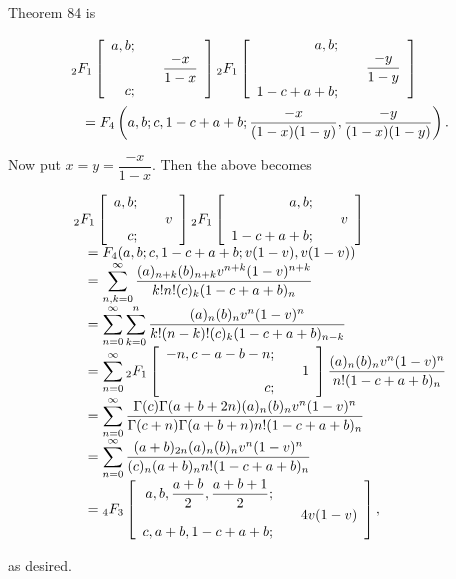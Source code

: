 \begin{solution}
Theorem 84 is 

\begin{eqnarray*}
\lefteqn{{}_2F_1 \left[ \begin{array}{rlr}
a,b; & & \\
& & \dfrac{-x}{1-x} \\
c; & & 
\end{array} \right] {}_2F_1 \left[ \begin{array}{rlr}
a,b ; & & \\
& & \dfrac{-y}{1-y} \\
1-c+a+b; & & 
\end{array} \right] }\\
&& =F_4 \left(a,b;c,1-c+a+b; \dfrac{-x}{(1-x)(1-y)}, \dfrac{-y}{(1-x)(1-y)} \right).
\end{eqnarray*}

Now put $x=y=\dfrac{-x}{1-x}$. Then the above becomes

$$\begin{array}{ll}
\lefteqn{{}_2F_1 \left[ \begin{array}{rlr}
a,b; & & \\
& & v \\
c; & &
\end{array} \right] {}_2F_1 \left[ \begin{array}{rlr}
a,b; & & \\
& & v \\
1-c+a+b; & &
\end{array} \right]}\\
&= F_4(a,b;c,1-c+a+b; v(1-v), v(1-v)) \\
&= \displaystyle\sum_{n,k=0}^{\infty} \dfrac{(a)_{n+k} (b)_{n+k} v^{n+k} (1-v)^{n+k}}{k! n! (c)_k (1-c+a+b)_n} \\
&= \displaystyle\sum_{n=0}^{\infty} \displaystyle\sum_{k=0}^n \dfrac{(a)_n (b)_n v^n (1-v)^n}{k! (n-k)! (c)_k (1-c+a+b)_{n-k}} \\
&= \displaystyle\sum_{n=0}^{\infty} {}_2F_1 \left[ \begin{array}{rlr}
-n, c-a-b-n; & & \\
& & 1 \\
c; & & 
\end{array} \right] \dfrac{(a)_n (b)_n v^n (1-v)^n}{n! (1-c+a+b)_n} \\
&= \displaystyle\sum_{n=0}^{\infty} \dfrac{\Gamma(c) \Gamma(a+b+2n) (a)_n (b)_n v^n (1-v)^n}{\Gamma(c+n) \Gamma(a+b+n) n! (1-c+a+b)_n} \\
&= \displaystyle\sum_{n=0}^{\infty} \dfrac{(a+b)_{2n} (a)_n (b)_n v^n (1-v)^n}{(c)_n (a+b)_n n! (1-c+a+b)_n} \\
&= {}_4F_3 \left[ \begin{array}{rlr}
a,b,\dfrac{a+b}{2}, \dfrac{a+b+1}{2}; & & \\
& & 4v(1-v) \\
c,a+b,1-c+a+b; & & 
\end{array} \right],
\end{array}$$

as desired.
\end{solution}
